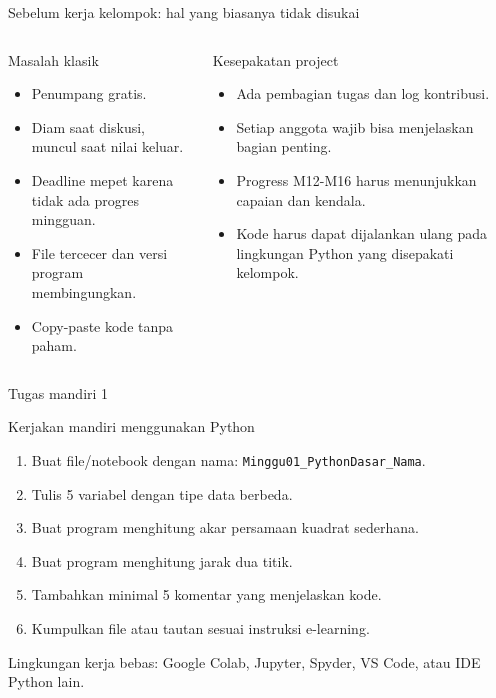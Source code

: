 \documentclass[aspectratio=169,11pt]{beamer}
\begin{document}
\begin{frame}{Sebelum kerja kelompok: hal yang biasanya tidak disukai}
\begin{columns}[T]
\begin{block}{Masalah klasik}
\begin{itemize}
  \item Penumpang gratis.
  \item Diam saat diskusi, muncul saat nilai keluar.
  \item Deadline mepet karena tidak ada progres mingguan.
  \item File tercecer dan versi program membingungkan.
  \item Copy-paste kode tanpa paham.
\end{itemize}
\end{block}
\begin{block}{Kesepakatan project}
\begin{itemize}
  \item Ada pembagian tugas dan log kontribusi.
  \item Setiap anggota wajib bisa menjelaskan bagian penting.
  \item Progress M12-M16 harus menunjukkan capaian dan kendala.
  \item Kode harus dapat dijalankan ulang pada lingkungan Python yang disepakati kelompok.
\end{itemize}
\end{block}
\end{columns}
\end{frame}

\begin{frame}{Tugas mandiri 1}
\begin{block}{Kerjakan mandiri menggunakan Python}
\begin{enumerate}
  \item Buat file/notebook dengan nama: \texttt{Minggu01\_PythonDasar\_Nama}.
  \item Tulis 5 variabel dengan tipe data berbeda.
  \item Buat program menghitung akar persamaan kuadrat sederhana.
  \item Buat program menghitung jarak dua titik.
  \item Tambahkan minimal 5 komentar yang menjelaskan kode.
  \item Kumpulkan file atau tautan sesuai instruksi e-learning.
\end{enumerate}
\end{block}
\vspace{1mm}
\footnotesize Lingkungan kerja bebas: Google Colab, Jupyter, Spyder, VS Code, atau IDE Python lain.
\end{frame}
\end{document}
